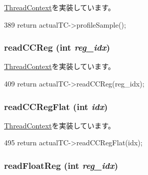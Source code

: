 \hyperlink{classThreadContext_a46e9ef08695527c8b4bd0e668bced5a8}{ThreadContext}を実装しています。


\begin{DoxyCode}
389 { return actualTC->profileSample(); }
\end{DoxyCode}
\hypertarget{classProxyThreadContext_ac3d147c535052bfb1f8e8fe0697168d7}{
\subsubsection[{readCCReg}]{ readCCReg (int {\em reg\_\-idx})}}
\label{classProxyThreadContext_ac3d147c535052bfb1f8e8fe0697168d7}


\hyperlink{classThreadContext_af924a3ae757b2a311dd16bc8acde1c27}{ThreadContext}を実装しています。


\begin{DoxyCode}
409     { return actualTC->readCCReg(reg_idx); }
\end{DoxyCode}
\hypertarget{classProxyThreadContext_a78f8bb511732f8abab3bd11a18d32072}{
\subsubsection[{readCCRegFlat}]{ readCCRegFlat (int {\em idx})}}
\label{classProxyThreadContext_a78f8bb511732f8abab3bd11a18d32072}


\hyperlink{classThreadContext_aa6d1af2db95563430c5ce31b38838a93}{ThreadContext}を実装しています。


\begin{DoxyCode}
495     { return actualTC->readCCRegFlat(idx); }
\end{DoxyCode}
\hypertarget{classProxyThreadContext_a2f97d83baef4fbda00b7f7f62779752f}{
\subsubsection[{readFloatReg}]{ readFloatReg (int {\em reg\_\-idx})}}
\label{classProxyThreadContext_a2f97d83baef4fbda00b7f7f62779752f}


